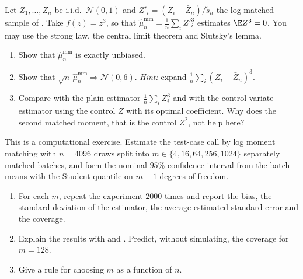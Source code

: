 \begin{exercise}\label{ex:cv-skewness}
\medium Let $Z_1,\dots,Z_n$ be i.i.d.\ $\mathcal N(0,1)$ and $Z'_i=(Z_i-\bar Z_n)/\tilde s_n$ the
log-matched sample of . Take $f(z)=z^3$, so that
$\hat\mu^{\mathrm{mm}}_n=\frac1n\sum_iZ'^3_i$ estimates $\E Z^3=0$. You may use the strong
law, the central limit theorem and Slutsky's lemma.
\begin{enumerate}[label=(\alph*)]
  \item Show that $\hat\mu^{\mathrm{mm}}_n$ is exactly unbiased.
  \item Show that $\sqrt n\,\hat\mu^{\mathrm{mm}}_n\Rightarrow\mathcal N(0,6)$.
    \emph{Hint:} expand $\frac1n\sum_i(Z_i-\bar Z_n)^3$.
  \item Compare with the plain estimator $\frac1n\sum_iZ_i^3$ and with the control-variate
    estimator using the control $Z$ with its optimal coefficient. Why does the second matched
    moment, that is the control $Z^2$, not help here?
\end{enumerate}
\end{exercise}

\begin{exercise}\label{ex:cv-mm-coverage}
\medium This is a computational exercise. Estimate the test-case call by log moment
matching with $n=4096$ draws split into $m\in\{4,16,64,256,1024\}$ separately matched
batches, and form the nominal $95\%$ confidence interval from the batch means with the
Student quantile on $m-1$ degrees of freedom.
\begin{enumerate}[label=(\alph*)]
  \item For each $m$, repeat the experiment $2000$ times and report the bias, the standard
    deviation of the estimator, the average estimated standard error and the coverage.
  \item Explain the results with  and
    . Predict, without simulating, the coverage for $m=128$.
  \item Give a rule for choosing $m$ as a function of $n$.
\end{enumerate}
\end{exercise}

